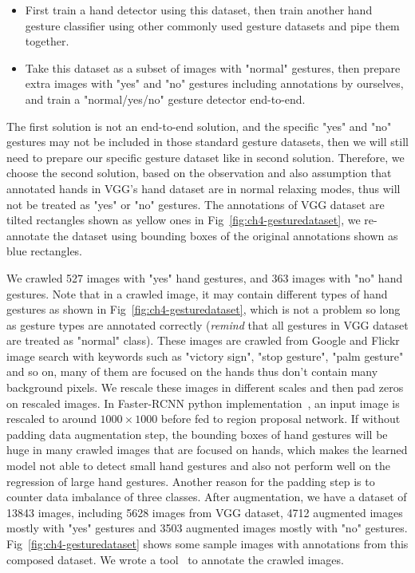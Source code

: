 \begin{itemize}
\item First train a hand detector using this dataset, then train another hand gesture classifier using other commonly used gesture datasets and pipe them together.
\item Take this dataset as a subset of images with "normal" gestures, then prepare extra images with "yes" and "no" gestures including annotations by ourselves, and train a "normal/yes/no" gesture detector end-to-end.
\end{itemize}

The first solution is not an end-to-end solution, and the specific "yes" and "no" gestures may not be included in those standard gesture datasets, then we will still need to prepare our specific gesture dataset like in second solution. Therefore, we choose the second solution, based on the observation and also assumption that annotated hands in VGG's hand dataset are in normal relaxing modes, thus will not be treated as "yes" or "no" gestures. The annotations of VGG dataset are tilted rectangles shown as yellow ones in Fig~\ref{fig:ch4-gesturedataset}, we re-annotate the dataset using bounding boxes of the original annotations shown as blue rectangles.

We crawled 527 images with "yes" hand gestures, and 363 images with "no" hand gestures. Note that in a crawled image, it may contain different types of hand gestures as shown in Fig~\ref{fig:ch4-gesturedataset}, which is not a problem so long as gesture types are annotated correctly (\emph{remind} that all gestures in VGG dataset are treated as "normal" class). These images are crawled from Google and Flickr image search with keywords such as "victory sign", "stop gesture", "palm gesture" and so on, many of them are focused on the hands thus don't contain many background pixels. We rescale these images in different scales and then pad zeros on rescaled images. In Faster-RCNN python implementation~\cite{links:pyfasterrcnn}, an input image is rescaled to around $1000\times 1000$ before fed to region proposal network. If without padding data augmentation step, the bounding boxes of hand gestures will be huge in many crawled images that are focused on hands, which makes the learned model not able to detect small hand gestures and also not perform well on the regression of large hand gestures. Another reason for the padding step is to counter data imbalance of three classes. After augmentation, we have a dataset of 13843 images, including 5628 images from VGG dataset, 4712 augmented images mostly with "yes" gestures and 3503 augmented images mostly with "no" gestures. Fig~\ref{fig:ch4-gesturedataset} shows some sample images with annotations from this composed dataset. We wrote a tool~\cite{links:imgannota} to annotate the crawled images.

